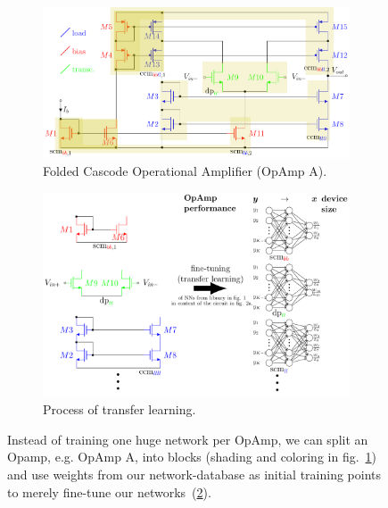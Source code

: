\documentclass[conference]{IEEEtran}
\begin{document}
	\begin{figure}[]
		\begin{subfigure}{.48\textwidth}
			\centering
			\includegraphics[width=\linewidth]{figures/simple52_partitioning}
			\setlength{\abovecaptionskip}{0ex}%
			\setlength{\belowcaptionskip}{0ex}%
			\caption{Folded Cascode Operational Amplifier (OpAmp A).}
			\label{fig:simple53}
		\end{subfigure}
			\hfill
		\begin{subfigure}{.5\textwidth}
			\centering
			\includegraphics[width=\linewidth]{figures/finetuning-networks2}
			\setlength{\abovecaptionskip}{-2ex}%
			\caption{Process of transfer learning.}
			\label{fig:fine-tuning}
		\end{subfigure}
			\setlength{\abovecaptionskip}{3ex}%
			\setlength{\belowcaptionskip}{-3ex}%
			\caption{Instead of training one huge network per OpAmp, we can split an Opamp, e.g. OpAmp A, into blocks (shading and coloring in fig.~\ref{fig:simple53}) and use weights from our network-database as initial training points to merely fine-tune our networks~(\ref{fig:fine-tuning}). }
			\label{fig:training-process}
		\end{figure}
		
\end{document}
